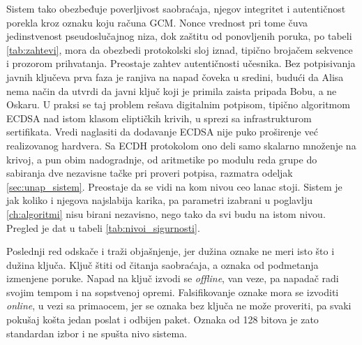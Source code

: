 Sistem tako obezbeđuje poverljivost saobraćaja, njegov integritet i autentičnost porekla kroz oznaku koju računa GCM. Nonce vrednost pri tome čuva jedinstvenost pseudoslučajnog niza, dok zaštitu od ponovljenih poruka, po tabeli \ref{tab:zahtevi}, mora da obezbedi protokolski sloj iznad, tipično brojačem sekvence i prozorom prihvatanja. Preostaje zahtev autentičnosti učesnika. Bez potpisivanja javnih ključeva prva faza je ranjiva na napad čoveka u sredini, budući da Alisa nema način da utvrdi da javni ključ koji je primila zaista pripada Bobu, a ne Oskaru. U praksi se taj problem rešava digitalnim potpisom, tipično algoritmom ECDSA nad istom klasom eliptičkih krivih, u sprezi sa infrastrukturom sertifikata.
\smallbreak
Vredi naglasiti da dodavanje ECDSA nije puko proširenje već realizovanog hardvera. Sa ECDH protokolom ono deli samo skalarno množenje na krivoj, a pun obim nadogradnje, od aritmetike po modulu reda grupe do sabiranja dve nezavisne tačke pri proveri potpisa, razmatra odeljak \ref{sec:unap_sistem}.
\smallbreak
Preostaje da se vidi na kom nivou ceo lanac stoji. Sistem je jak koliko i njegova najslabija karika, pa parametri izabrani u poglavlju \ref{ch:algoritmi} nisu birani nezavisno, nego tako da svi budu na istom nivou. Pregled je dat u tabeli \ref{tab:nivoi_sigurnosti}.

\begin{table}[H]
\caption{Sigurnosni nivo pojedinih karika sistema. Nivo ECDH jezgra je polovina bitske dužine reda tačke (odeljak \ref{subsec:skalarno_mnozenje})}
\centering
\setlength{\tabcolsep}{5pt}
\renewcommand{\arraystretch}{1.4}
\label{tab:nivoi_sigurnosti}
\end{table}

Poslednji red odskače i traži objašnjenje, jer dužina oznake ne meri isto što i dužina ključa. Ključ štiti od čitanja saobraćaja, a oznaka od podmetanja izmenjene poruke. Napad na ključ izvodi se \textit{offline}, van veze, pa napadač radi svojim tempom i na sopstvenoj opremi. Falsifikovanje oznake mora se izvoditi \textit{online}, u vezi sa primaocem, jer se oznaka bez ključa ne može proveriti, pa svaki pokušaj košta jedan poslat i odbijen paket. Oznaka od 128 bitova je zato standardan izbor i ne spušta nivo sistema.
